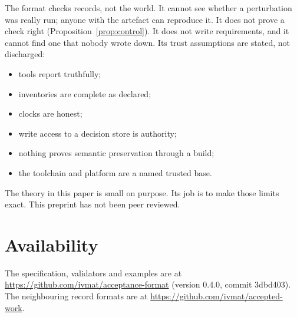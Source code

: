 \documentclass[11pt]{article}
\theoremstyle{definition}
\theoremstyle{remark}
\begin{document}
The format checks records, not the world. It cannot see whether a perturbation was really run;
anyone with the artefact can reproduce it. It does not prove a check right
(Proposition~\ref{prop:control}). It does not write requirements, and it cannot find one that
nobody wrote down. Its trust assumptions are stated, not discharged:
\begin{itemize}[itemsep=1pt]
\item tools report truthfully;
\item inventories are complete as declared;
\item clocks are honest;
\item write access to a decision store is authority;
\item nothing proves semantic preservation through a build;
\item the toolchain and platform are a named trusted base.
\end{itemize}
The theory in this paper is small on purpose. Its job is to make those limits exact. This preprint
has not been peer reviewed.

\section*{Availability}
The specification, validators and examples are at
\url{https://github.com/ivmat/acceptance-format} (version 0.4.0, commit 3dbd403). The neighbouring record formats
are at \url{https://github.com/ivmat/accepted-work}.
\end{document}
